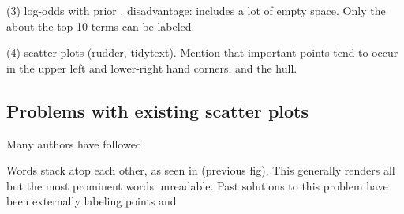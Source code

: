 \documentclass[11pt]{article}
\begin{document}
(3) log-odds with prior \cite{monroe08}.  disadvantage: includes a lot of empty space.  Only the about the top 10 terms can be labeled.

(4) scatter plots (rudder, tidytext).  Mention that important points tend to occur in the upper left and lower-right hand corners, and the hull.  

\subsection{Problems with existing scatter plots}

Many authors have followed \cite{monroe08} 

Words stack atop each other, as seen in (previous fig).  This generally renders all but the most prominent words unreadable. Past solutions to this problem have been externally labeling points \cite{schofield2016gender} and 
\end{document}
